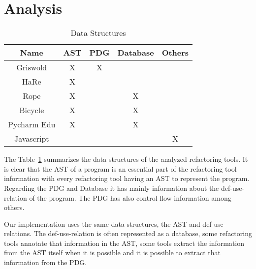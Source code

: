 \section{Analysis}
\begin{table}[]
\centering
\caption{Data Structures}
\label{tab:my-table}
\begin{tabular}{c|c|c|c|c}
Name       & AST & PDG & Database & Others \\ \hline
Griswold   & X   & X   &          &        \\ \hline
HaRe       & X   &     &          &        \\ \hline
Rope       & X   &     & X        &        \\ \hline
Bicycle    & X   &     & X        &        \\ \hline
Pycharm Edu & X   &     & X        &        \\ \hline
Javascript &     &     &          & X
\end{tabular}
\end{table}

The Table~\ref{tab:my-table} summarizes the data structures of the analyzed refactoring tools.
It is clear that the AST of a program is an essential part of the refactoring
tool information with every refactoring tool having an AST to represent the program.
Regarding the PDG and Database it has mainly information about the def-use-relation
of the program. The PDG has also control flow information among others.


Our implementation uses the same data structures, the AST and
def-use-relations. The def-use-relation is often represented as a database,
some refactoring tools annotate that information in the AST, %
some tools extract the information from the AST itself when it is possible and
it is possible to extract that information from the PDG.\\


